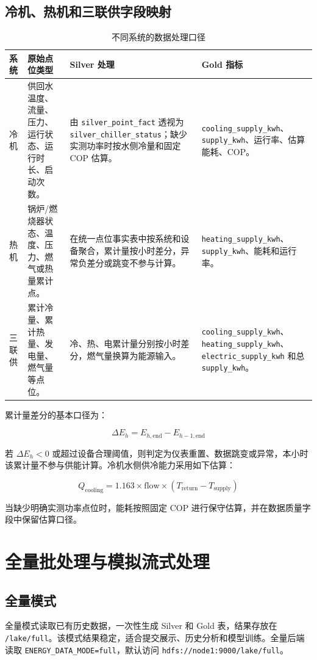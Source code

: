 \documentclass[UTF8,11pt,a4paper]{ctexart}
\newcommand{\code}[1]{\texttt{#1}}
\begin{document}
\subsection{冷机、热机和三联供字段映射}

\begin{table}[H]
\centering
\small
\begin{tabularx}{\textwidth}{p{2cm}Y Y Y}
\toprule
系统 & 原始点位类型 & Silver 处理 & Gold 指标 \\
\midrule
冷机 & 供回水温度、流量、压力、运行状态、运行时长、启动次数。 & 由 \code{silver\_point\_fact} 透视为 \code{silver\_chiller\_status}；缺少实测功率时按水侧冷量和固定 COP 估算。 & \code{cooling\_supply\_kwh}、\code{supply\_kwh}、运行率、估算能耗、COP。 \\
热机 & 锅炉/燃烧器状态、温度、压力、燃气或热量累计点。 & 在统一点位事实表中按系统和设备聚合，累计量按小时差分，异常负差分或跳变不参与计算。 & \code{heating\_supply\_kwh}、\code{supply\_kwh}、能耗和运行率。 \\
三联供 & 累计冷量、累计热量、发电量、燃气量等点位。 & 冷、热、电累计量分别按小时差分，燃气量换算为能源输入。 & \code{cooling\_supply\_kwh}、\code{heating\_supply\_kwh}、\code{electric\_supply\_kwh} 和总 \code{supply\_kwh}。 \\
\bottomrule
\end{tabularx}
\caption{不同系统的数据处理口径}
\end{table}

累计量差分的基本口径为：

\[
  \Delta E_h = E_{h,\mathrm{end}} - E_{h-1,\mathrm{end}}
\]

若 \(\Delta E_h < 0\) 或超过设备合理阈值，则判定为仪表重置、数据跳变或异常，本小时该累计量不参与供能计算。冷机水侧供冷能力采用如下估算：

\[
  Q_{\mathrm{cooling}} = 1.163 \times \mathrm{flow} \times (T_{\mathrm{return}} - T_{\mathrm{supply}})
\]

当缺少明确实测功率点位时，能耗按照固定 COP 进行保守估算，并在数据质量字段中保留估算口径。

\section{全量批处理与模拟流式处理}

\subsection{全量模式}

全量模式读取已有历史数据，一次性生成 Silver 和 Gold 表，结果存放在 \code{/lake/full}。该模式结果稳定，适合提交展示、历史分析和模型训练。全量后端读取 \code{ENERGY\_DATA\_MODE=full}，默认访问 \code{hdfs://node1:9000/lake/full}。
\end{document}
